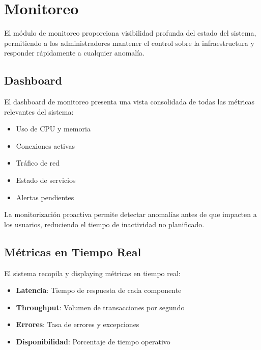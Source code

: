 
\chapter{Monitoreo}

El módulo de monitoreo proporciona visibilidad profunda del estado del sistema, permitiendo a los administradores mantener el control sobre la infraestructura y responder rápidamente a cualquier anomalía.

\section{Dashboard}

El dashboard de monitoreo presenta una vista consolidada de todas las métricas relevantes del sistema:

\begin{itemize}
    \item Uso de CPU y memoria
    \item Conexiones activas
    \item Tráfico de red
    \item Estado de servicios
    \item Alertas pendientes
\end{itemize}

La monitorización proactiva permite detectar anomalías antes de que impacten a los usuarios, reduciendo el tiempo de inactividad no planificado.

\section{Métricas en Tiempo Real}

El sistema recopila y displaying métricas en tiempo real:

\begin{itemize}
    \item \textbf{Latencia}: Tiempo de respuesta de cada componente
    \item \textbf{Throughput}: Volumen de transacciones por segundo
    \item \textbf{Errores}: Tasa de errores y excepciones
    \item \textbf{Disponibilidad}: Porcentaje de tiempo operativo
\end{itemize}


